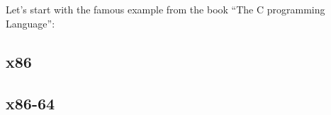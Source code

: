 \section{\HelloWorldSectionName}
\label{sec:helloworld}

{Let's start with the famous example from the book}
``The C programming Language''\cite{Kernighan:1988:CPL:576122}:



\subsection{x86}




\subsection{x86-64}




